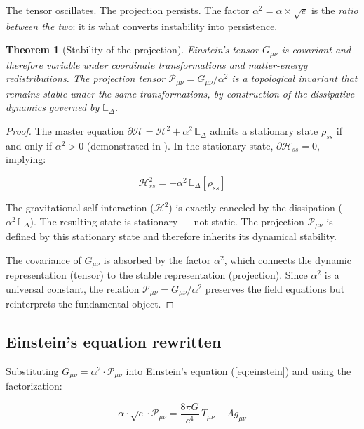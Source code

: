 \documentclass[12pt,a4paper,twoside]{article}
\newtheorem{theorem}{Theorem}[section]
\newcommand{\alphaii}{\alpha^{2}}
\begin{document}
The tensor oscillates. The projection persists. The factor $\alphaii = \alpha \times \sqrt{e}$ is the \textit{ratio between the two}: it is what converts instability into persistence.

\begin{theorem}[Stability of the projection]
\label{thm:estabilidade}
Einstein's tensor $G_{\mu\nu}$ is covariant and therefore variable under coordinate transformations and matter-energy redistributions. The projection tensor $\mathcal{P}_{\mu\nu} = G_{\mu\nu}/\alphaii$ is a topological invariant that remains stable under the same transformations, by construction of the dissipative dynamics governed by $\mathbb{L}_\Delta$.
\end{theorem}

\begin{proof}
The master equation $\partial\mathcal{H} = \mathcal{H}^2 + \alphaii\,\mathbb{L}_\Delta$ admits a stationary state $\rho_{ss}$ if and only if $\alphaii > 0$ (demonstrated in \cite{Miguel2025Alpha2}). In the stationary state, $\partial\mathcal{H}_{ss} = 0$, implying:

\begin{equation}
\mathcal{H}_{ss}^2 = -\alphaii\,\mathbb{L}_\Delta[\rho_{ss}]
\end{equation}

The gravitational self-interaction ($\mathcal{H}^2$) is exactly canceled by the dissipation ($\alphaii\,\mathbb{L}_\Delta$). The resulting state is stationary --- not static. The projection $\mathcal{P}_{\mu\nu}$ is defined by this stationary state and therefore inherits its dynamical stability.

The covariance of $G_{\mu\nu}$ is absorbed by the factor $\alphaii$, which connects the dynamic representation (tensor) to the stable representation (projection). Since $\alphaii$ is a universal constant, the relation $\mathcal{P}_{\mu\nu} = G_{\mu\nu}/\alphaii$ preserves the field equations but reinterprets the fundamental object.
\end{proof}


\subsection{Einstein's equation rewritten}

Substituting $G_{\mu\nu} = \alphaii \cdot \mathcal{P}_{\mu\nu}$ into Einstein's equation (\ref{eq:einstein}) and using the factorization:

\begin{equationbox}[title={Einstein's Equation in TGL}]
\begin{equation}
\boxed{\alpha \cdot \sqrt{e} \cdot \mathcal{P}_{\mu\nu} = \frac{8\pi G}{c^4}\, T_{\mu\nu} - \Lambda g_{\mu\nu}}
\label{eq:einstein_tgl}
\end{equation}
\end{equationbox}
\end{document}
